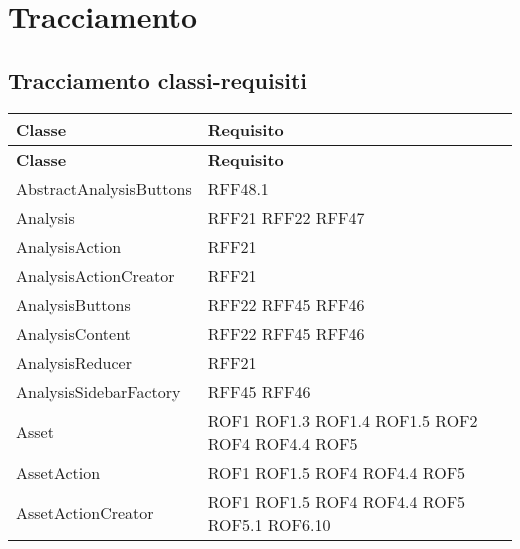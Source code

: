 \newpage

\section{Tracciamento}
	
	\subsection{Tracciamento classi-requisiti}
\def\arraystretch{1.5}
\begin{longtable}{p{5cm}!{\VRule[1pt]}p{2.5cm}}
	\color{white} \textbf{Classe} & \color{white} \textbf{Requisito} \\ 
	\endfirsthead
	\color{white} \textbf{Classe} & \color{white} \textbf{Requisito} \\ 
	\endhead
	AbstractAnalysisButtons & RFF48.1\\
	Analysis & RFF21 \newline RFF22 \newline RFF47\\
	AnalysisAction & RFF21\\
	AnalysisActionCreator & RFF21\\
	AnalysisButtons & RFF22 \newline RFF45 \newline RFF46\\
	AnalysisContent & RFF22 \newline RFF45 \newline RFF46\\
	AnalysisReducer & RFF21\\
	AnalysisSidebarFactory & RFF45 \newline RFF46\\
	Asset & ROF1 \newline ROF1.3 \newline ROF1.4 \newline ROF1.5 \newline ROF2 \newline ROF4 \newline ROF4.4 \newline ROF5\\
	AssetAction & ROF1 \newline ROF1.5 \newline ROF4 \newline ROF4.4 \newline ROF5\\
	AssetActionCreator & ROF1 \newline ROF1.5 \newline ROF4 \newline ROF4.4 \newline ROF5 \newline ROF5.1 \newline ROF6.10\\

\end{longtable}
